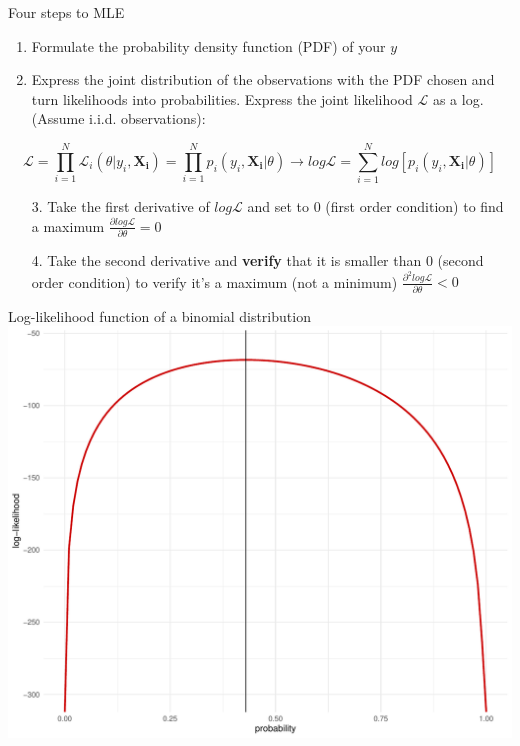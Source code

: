 \documentclass[xcolor=table,dvipsnames]{beamer}
\begin{document}
\begin{frame}{Four steps to MLE}
\begin{enumerate}
\item Formulate the probability density function (PDF) of your $y$ \pause
\item Express the joint distribution of the observations with the PDF chosen and turn likelihoods into probabilities. Express the joint likelihood $\mathcal{L}$ as a log. (Assume i.i.d. observations): \pause
\end{enumerate}
$$ \mathcal{L} = \prod_{i=1}^{N}\mathcal{L}_i(\theta|y_i,\mathbf{X_i})= \prod_{i=1}^{N}p_i(y_i,\mathbf{X_i}|\theta) \rightarrow log\mathcal{L}= \sum_{i=1}^{N} log[p_i(y_i,\mathbf{X_i}|\theta)]$$ \pause
\begin{enumerate}
\item[3.] Take the first derivative of $log\mathcal{L}$ and set to 0 (first order condition) to find a maximum \pause $\frac{\partial log\mathcal{L}}{\partial \theta}=0$\pause
\item[4.] Take the second derivative and \textbf{verify} that it is smaller than 0 (second order condition) to verify it's a maximum (not a minimum) \pause $\frac{\partial^2 log\mathcal{L}}{\partial \theta}<0$
\end{enumerate}
\end{frame}

\begin{frame}{Log-likelihood function of a binomial distribution}
\centering
\includegraphics[scale=0.45]{pictures/week_24_ll_binomial.pdf} 
\end{frame}
\end{document}
